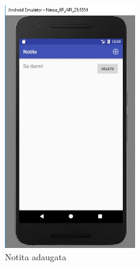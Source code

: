 \begin{figure}[!ht]
	
	\centering
	
	\includegraphics[width=0.5\textwidth]{Cattura2.JPG}
	
	\caption{Notita adaugata}
	
	\label{Im_label}
	
\end{figure}


\clearpage